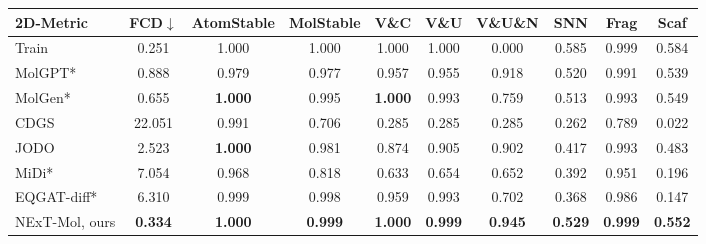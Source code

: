 \begin{tabular}{lccccccccc} \toprule
2D-Metric                      & FCD$\downarrow$              & AtomStable                            & MolStable                    & V\&C                                  & V\&U                         & V\&U\&N                      & SNN                          & Frag                         & Scaf                         \\ \midrule
{\color{gray} Train}   & {\color{gray} 0.251} & {\color{gray} 1.000}          & {\color{gray} 1.000} & {\color{gray} 1.000}          & {\color{gray} 1.000} & {\color{gray} 0.000} & {\color{gray} 0.585} & {\color{gray} 0.999} & {\color{gray} 0.584} \\
MolGPT* & 0.888 & 0.979          & 0.977 & 0.957          & 0.955 & 0.918 & 0.520 & 0.991 & 0.539 \\
MolGen* & 0.655 & \textbf{1.000} & 0.995 & \textbf{1.000} & 0.993 & 0.759 & 0.513 & 0.993 & 0.549 \\
CDGS                           & 22.051                       & 0.991                                 & 0.706                        & 0.285                                 & 0.285                        & 0.285                        & 0.262                        & 0.789                        & 0.022                        \\
JODO                           & 2.523                        & \textbf{1.000}                        & 0.981                        & 0.874                                 & 0.905                        & 0.902                        & 0.417                        & 0.993                        & 0.483                        \\
MiDi*                          & 7.054                        & 0.968                                 & 0.818                        & 0.633                                 & 0.654                        & 0.652                        & 0.392                        & 0.951                        & 0.196                        \\
EQGAT-diff*                          & 6.310                        & 0.999                                 & 0.998                        & 0.959                                 & 0.993                        & 0.702                        & 0.368                        & 0.986                        & 0.147                        \\
NExT-Mol, ours                 & \textbf{0.334}               & \textbf{1.000}                        & \textbf{0.999}               & \textbf{1.000}                        & \textbf{0.999}               & \textbf{0.945}               & \textbf{0.529}               & \textbf{0.999}               & \textbf{0.552}               \\\midrule

\end{tabular}

